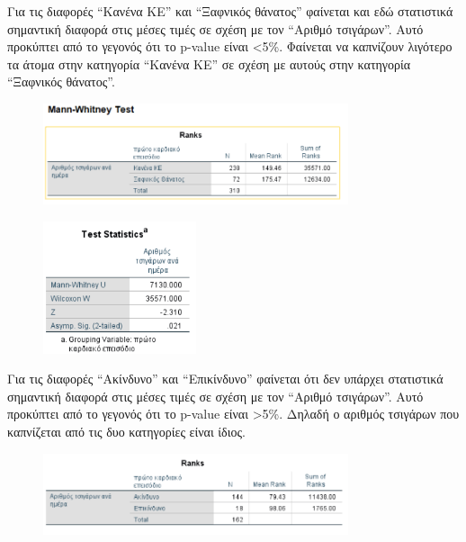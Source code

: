 \clearpage

Για τις διαφορές “Κανένα ΚΕ” και “Ξαφνικός θάνατος” φαίνεται και εδώ στατιστικά σημαντική διαφορά στις μέσες τιμές σε σχέση με τον “Αριθμό τσιγάρων”. Αυτό προκύπτει από το γεγονός ότι το p-value είναι <5\%. Φαίνεται να καπνίζουν λιγότερο τα άτομα στην κατηγορία “Κανένα ΚΕ” σε σχέση με αυτούς στην κατηγορία “Ξαφνικός θάνατος”.

\vspace{1cm}

\begin{figure}[h]
    \centering
    \includegraphics[width=0.8\textwidth]{images/208.PNG}
\end{figure}

\vspace{1cm}

\begin{figure}[h]
    \centering
    \includegraphics[width=0.4\textwidth]{images/209.PNG}
\end{figure}

Για τις διαφορές “Ακίνδυνο” και “Επικίνδυνο” φαίνεται ότι δεν υπάρχει στατιστικά σημαντική διαφορά στις μέσες τιμές σε σχέση με τον “Αριθμό τσιγάρων”. Αυτό προκύπτει από το γεγονός ότι το p-value είναι >5\%. Δηλαδή ο αριθμός τσιγάρων που καπνίζεται από τις δυο κατηγορίες είναι ίδιος.

\begin{figure}[h]
    \centering
    \includegraphics[width=0.8\textwidth]{images/210.PNG}
\end{figure}

